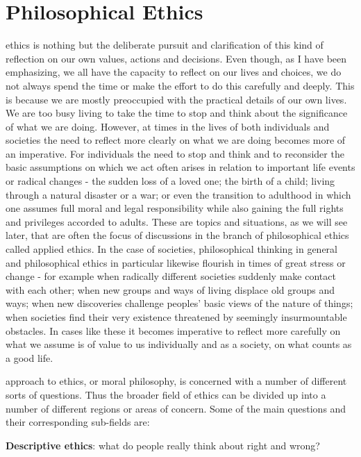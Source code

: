 \documentclass[justified]{tufte-book}
\begin{document}
\hypertarget{philosophical-ethics}{%
\section{Philosophical Ethics}\label{philosophical-ethics}}

 ethics is nothing but the deliberate pursuit and clarification of this kind of reflection on our own values, actions and decisions. Even though, as I have been emphasizing, we all have the capacity to reflect on our lives and choices, we do not always spend the time or make the effort to do this carefully and deeply. This is because we are mostly preoccupied with the practical details of our own lives. We are too busy living to take the time to stop and think about the significance of what we are doing. However, at times in the lives of both individuals and societies the need to reflect more clearly on what we are doing becomes more of an imperative. For individuals the need to stop and think and to reconsider the basic assumptions on which we act often arises in relation to important life events or radical changes - the sudden loss of a loved one; the birth of a child; living through a natural disaster or a war; or even the transition to adulthood in which one assumes full moral and legal responsibility while also gaining the full rights and privileges accorded to adults. These are topics and situations, as we will see later, that are often the focus of discussions in the branch of philosophical ethics called applied ethics. In the case of societies, philosophical thinking in general and philosophical ethics in particular likewise flourish in times of great stress or change - for example when radically different societies suddenly make contact with each other; when new groups and ways of living displace old groups and ways; when new discoveries challenge peoples' basic views of the nature of things; when societies find their very existence threatened by seemingly insurmountable obstacles. In cases like these it becomes imperative to reflect more carefully on what we assume is of value to us individually and as a society, on what counts as a good life.

 approach to ethics, or moral philosophy, is concerned with a number of different sorts of questions. Thus the broader field of ethics can be divided up into a number of different regions or areas of concern. Some of the main questions and their corresponding sub-fields are:

\begin{marginfigure}
\textbf{Descriptive ethics}: what do people really think about right and
wrong?
\end{marginfigure}
\end{document}
